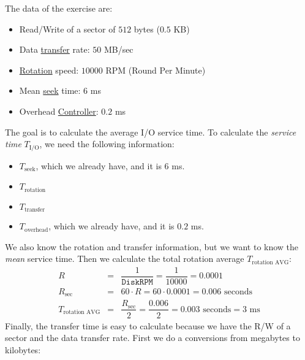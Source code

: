 \begin{exercisebox}\label{exercise: mean service time of an I/O operation}
    The data of the exercise are:
    \begin{itemize}
        \item Read/Write of a sector of $512$ bytes ($0.5$ KB)
        \item Data \underline{transfer} rate: $50$ MB/sec
        \item \underline{Rotation} speed: $10000$ RPM (Round Per Minute)
        \item Mean \underline{seek} time: $6$ ms
        \item Overhead \underline{Controller}: $0.2$ ms
    \end{itemize}
    The goal is to calculate the average I/O service time. To calculate the \emph{service time} $T_{\text{I/O}}$, we need the following information:
    \begin{itemize}
        \item[\textcolor{Green3}{\faIcon{check}}] $T_{\text{seek}}$, which we already have, and it is $6$ ms.
        \item[\textcolor{Red2}{\faIcon{times}}] $T_{\text{rotation}}$
        \item[\textcolor{Red2}{\faIcon{times}}] $T_{\text{transfer}}$
        \item[\textcolor{Green3}{\faIcon{check}}] $T_{\text{overhead}}$, which we already have, and it is $0.2$ ms.
    \end{itemize}
    We also know the rotation and transfer information, but we want to know the \emph{mean} service time. Then we calculate the total rotation average $T_{\text{rotation AVG}}$:
    \begin{equation*}
        \begin{array}{rcl}
            R &=& \dfrac{1}{\texttt{DiskRPM}} = \dfrac{1}{10000} = 0.0001 \\ [1em]
            R_{\text{sec}} &=& 60 \cdot R = 60 \cdot 0.0001 = 0.006 \text{ seconds} \\ [1em]
            T_{\text{rotation AVG}} &=& \dfrac{R_{\text{sec}}}{2} = \dfrac{0.006}{2} = 0.003 \text{ seconds} = 3 \text{ ms}
        \end{array}
    \end{equation*}
    Finally, the transfer time is easy to calculate because we have the R/W of a sector and the data transfer rate. First we do a conversions from megabytes to kilobytes:
    \begin{equation*}

\end{equation*}
\end{exercisebox}
